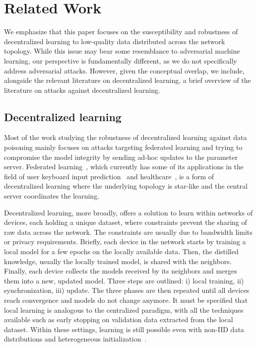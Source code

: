 \section{Related Work}
We emphasize that this paper focuses on the susceptibility and robustness of decentralized learning to low-quality data distributed across the network topology. While this issue may bear some resemblance to adversarial machine learning, our perspective is fundamentally different, as we do not specifically address adversarial attacks. However, given the conceptual overlap, we include, alongside the relevant literature on decentralized learning, a brief overview of the literature on attacks against decentralized learning.

\subsection{Decentralized learning}
Most of the work studying the robustness of decentralized learning against data poisoning mainly focuses on attacks targeting federated learning and trying to compromise the model integrity by sending ad-hoc updates to the parameter server. Federated learning~\cite{mcmahan2017communication}, which currently has some of its applications in the field of user keyboard input prediction~\cite{hard2018federated} and healthcare~\cite{shiranthika2023decentralized}, is a form of decentralized learning where the underlying topology is star-like and the central server coordinates the learning. 

Decentralized learning, more broadly, offers a solution to learn within networks of devices, each holding a unique dataset, where constraints prevent the sharing of raw data across the network. The constraints are usually due to bandwidth limits or privacy requirements. Briefly, each device in the network starts by training a local model for a few epochs on the locally available data. Then, the distilled knowledge, usually the locally trained model, is shared with the neighbors. Finally, each device collects the models received by its neighbors and merges them into a new, updated model. Three steps are outlined: i) local training, ii) synchronization, iii) update. The three phases are then repeated until all devices reach convergence and models do not change anymore. It must be specified that local learning is analogous to the centralized paradigm, with all the techniques available such as early stopping on validation data extracted from the local dataset. Within these settings, learning is still possible even with non-IID data distributions and heterogeneous initialization~\cite{valerio2023coordination}. 

